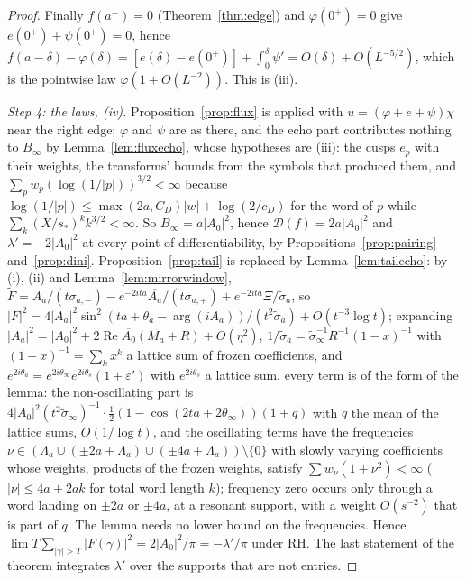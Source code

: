 \documentclass[11pt]{article}
\theoremstyle{definition}
\theoremstyle{remark}
\DeclareMathOperator{\Ree}{Re}
\begin{document}
\begin{proof}
Finally $f(a^-)=0$ (Theorem~\ref{thm:edge}) and $\varphi(0^+)=0$ give $e(0^+)+\psi(0^+)=0$, hence $f(a-\delta)-\varphi(\delta)=[e(\delta)-e(0^+)]+\int_0^\delta\psi'=O(\delta)+O(L^{-5/2})$, which is the pointwise law $\varphi(1+O(L^{-2}))$. This is (iii).

\emph{Step 4: the laws, (iv).} Proposition~\ref{prop:flux} is applied with $u=(\varphi+e+\psi)\chi$ near the right edge; $\varphi$ and $\psi$ are as there, and the echo part contributes nothing to $B_\infty$ by Lemma~\ref{lem:fluxecho}, whose hypotheses are (iii): the cusps $e_p$ with their weights, the transforms' bounds from the symbols that produced them, and $\sum_pw_p(\log(1/|p|))^{3/2}<\infty$ because $\log(1/|p|)\le\max(2a,C_D)|w|+\log(2/c_D)$ for the word of $p$ while $\sum_k(X/s_*)^kk^{3/2}<\infty$. So $B_\infty=a|A_0|^2$, hence $\mathcal D(f)=2a|A_0|^2$ and $\lambda'=-2|A_0|^2$ at every point of differentiability, by Propositions~\ref{prop:pairing} and~\ref{prop:dini}. Proposition~\ref{prop:tail} is replaced by Lemma~\ref{lem:tailecho}: by (i), (ii) and Lemma~\ref{lem:mirrorwindow}, $\tilde F=A_a/(t\sigma_{a,-})-e^{-2ita}\overline{A_a}/(t\sigma_{a,+})+e^{-2ita}\Xi/\tilde\sigma_a$, so $|F|^2=4|A_a|^2\sin^2(ta+\theta_a-\arg(iA_a))/(t^2\tilde\sigma_a)+O(t^{-3}\log t)$; expanding $|A_a|^2=|A_0|^2+2\Ree\overline{A_0}(M_a+R)+O(\eta^2)$, $1/\tilde\sigma_a=\tilde\sigma_\infty^{-1}R^{-1}(1-x)^{-1}$ with $(1-x)^{-1}=\sum_kx^k$ a lattice sum of frozen coefficients, and $e^{2i\theta_a}=e^{2i\theta_\infty}e^{2i\theta_s}(1+\varepsilon')$ with $e^{2i\theta_s}$ a lattice sum, every term is of the form of the lemma: the non-oscillating part is $4|A_0|^2(t^2\tilde\sigma_\infty)^{-1}\cdot\tfrac12(1-\cos(2ta+2\theta_\infty))(1+q)$ with $q$ the mean of the lattice sums, $O(1/\log t)$, and the oscillating terms have the frequencies $\nu\in(\Lambda_a\cup(\pm2a+\Lambda_a)\cup(\pm4a+\Lambda_a))\setminus\{0\}$ with slowly varying coefficients whose weights, products of the frozen weights, satisfy $\sum w_\nu(1+\nu^2)<\infty$ ($|\nu|\le4a+2ak$ for total word length $k$); frequency zero occurs only through a word landing on $\pm2a$ or $\pm4a$, at a resonant support, with a weight $O(s^{-2})$ that is part of $q$. The lemma needs no lower bound on the frequencies. Hence $\lim T\sum_{|\gamma|>T}|F(\gamma)|^2=2|A_0|^2/\pi=-\lambda'/\pi$ under RH. The last statement of the theorem integrates $\lambda'$ over the supports that are not entries.
\end{proof}
\end{document}

